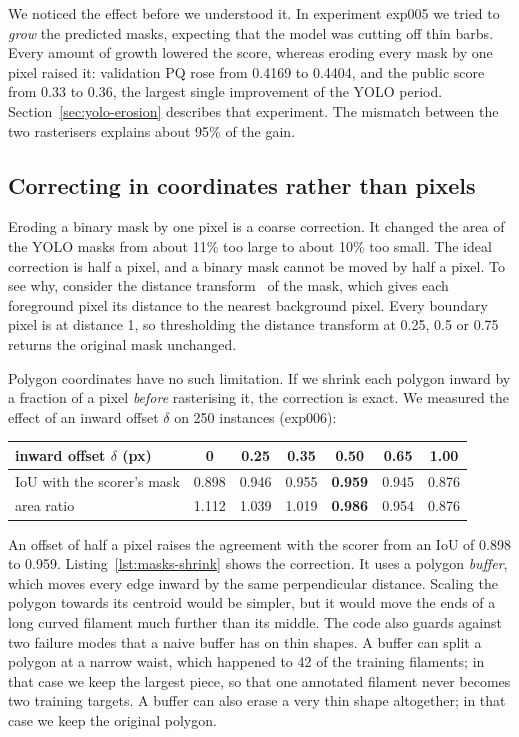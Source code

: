 We noticed the effect before we understood it. In experiment exp005 we tried to \emph{grow} the
predicted masks, expecting that the model was cutting off thin barbs. Every amount of growth
lowered the score, whereas eroding every mask by one pixel raised it: validation PQ rose from
0.4169 to 0.4404, and the public score from 0.33 to 0.36, the largest single improvement of the
YOLO period. Section~\ref{sec:yolo-erosion} describes that experiment. The mismatch between the two
rasterisers explains about 95\% of the gain.

\subsection{Correcting in coordinates rather than pixels}\label{sec:masks-shrink}
Eroding a binary mask by one pixel is a coarse correction. It changed the area of the YOLO masks
from about 11\% too large to about 10\% too small. The ideal correction is half a pixel, and a
binary mask cannot be moved by half a pixel. To see why, consider the distance
transform~\citep{borgefors1986} of the mask, which gives each foreground pixel its distance to the
nearest background pixel. Every
boundary pixel is at distance 1, so thresholding the distance transform at 0.25, 0.5 or 0.75
returns the original mask unchanged.

Polygon coordinates have no such limitation. If we shrink each polygon inward by a fraction of a
pixel \emph{before} rasterising it, the correction is exact. We measured the effect of an inward
offset $\delta$ on 250 instances (exp006):
\begin{center}\small
\begin{tabular}{@{}lcccccc@{}}
\toprule
inward offset $\delta$ (px) & 0 & 0.25 & 0.35 & \textbf{0.50} & 0.65 & 1.00 \\
\midrule
IoU with the scorer's mask & 0.898 & 0.946 & 0.955 & \textbf{0.959} & 0.945 & 0.876 \\
area ratio & 1.112 & 1.039 & 1.019 & \textbf{0.986} & 0.954 & 0.876 \\
\bottomrule
\end{tabular}
\end{center}
An offset of half a pixel raises the agreement with the scorer from an IoU of 0.898 to 0.959.
Listing~\ref{lst:masks-shrink} shows the correction. It uses a polygon \emph{buffer}, which moves
every edge inward by the same perpendicular distance. Scaling the polygon towards its centroid
would be simpler, but it would move the ends of a long curved filament much further than its
middle. The code also guards against two failure modes that a naive buffer has on thin shapes. A
buffer can split a polygon at a narrow waist, which happened to 42 of the \AllFilaments{} training
filaments; in that case we keep the largest piece, so that one annotated filament never becomes two
training targets. A buffer can also erase a very thin shape altogether; in that case we keep the
original polygon.

